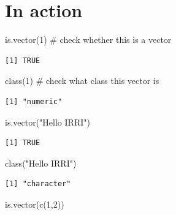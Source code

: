 \documentclass[
  letterpaper,
  DIV=11,
  numbers=noendperiod]{scrreprt}
\newenvironment{Shaded}{\begin{snugshade}}{\end{snugshade}}
\newcommand{\CommentTok}[1]{\textcolor[rgb]{0.37,0.37,0.37}{#1}}
\newcommand{\DecValTok}[1]{\textcolor[rgb]{0.68,0.00,0.00}{#1}}
\newcommand{\FunctionTok}[1]{\textcolor[rgb]{0.28,0.35,0.67}{#1}}
\newcommand{\NormalTok}[1]{\textcolor[rgb]{0.00,0.23,0.31}{#1}}
\newcommand{\StringTok}[1]{\textcolor[rgb]{0.13,0.47,0.30}{#1}}
\begin{document}
\hypertarget{in-action}{%
\section{In action}\label{in-action}}

\begin{Shaded}
\begin{Highlighting}[]
\FunctionTok{is.vector}\NormalTok{(}\DecValTok{1}\NormalTok{) }\CommentTok{\# check whether this is a vector}
\end{Highlighting}
\end{Shaded}

\begin{verbatim}
[1] TRUE
\end{verbatim}

\begin{Shaded}
\begin{Highlighting}[]
\FunctionTok{class}\NormalTok{(}\DecValTok{1}\NormalTok{) }\CommentTok{\# check what class this vector is}
\end{Highlighting}
\end{Shaded}

\begin{verbatim}
[1] "numeric"
\end{verbatim}

\begin{Shaded}
\begin{Highlighting}[]
\FunctionTok{is.vector}\NormalTok{(}\StringTok{"Hello IRRI"}\NormalTok{)}
\end{Highlighting}
\end{Shaded}

\begin{verbatim}
[1] TRUE
\end{verbatim}

\begin{Shaded}
\begin{Highlighting}[]
\FunctionTok{class}\NormalTok{(}\StringTok{"Hello IRRI"}\NormalTok{)}
\end{Highlighting}
\end{Shaded}

\begin{verbatim}
[1] "character"
\end{verbatim}

\begin{Shaded}
\begin{Highlighting}[]
\FunctionTok{is.vector}\NormalTok{(}\FunctionTok{c}\NormalTok{(}\DecValTok{1}\NormalTok{,}\DecValTok{2}\NormalTok{))}
\end{Highlighting}
\end{Shaded}
\end{document}
